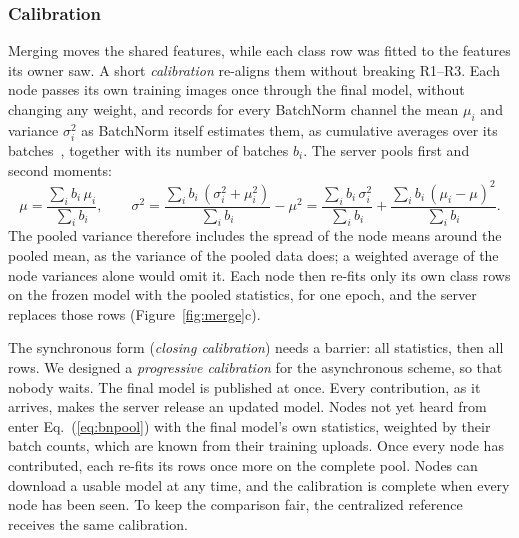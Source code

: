 \documentclass[pdflatex,sn-mathphys-num]{sn-jnl}
\begin{document}
\subsubsection{Calibration}\label{sec:calib}
Merging moves the shared features, while each class row was fitted to the features its owner saw. A short \emph{calibration} re-aligns them without breaking R1--R3. Each node passes its own training images once through the final model, without changing any weight, and records for every BatchNorm channel the mean $\mu_i$ and variance $\sigma_i^2$ as BatchNorm itself estimates them, as cumulative averages over its batches~\cite{ioffe2015bn}, together with its number of batches $b_i$. The server pools first and second moments:
\begin{equation}
\mu=\frac{\sum_i b_i\,\mu_i}{\sum_i b_i},\qquad
\sigma^2=\frac{\sum_i b_i\,(\sigma_i^2+\mu_i^2)}{\sum_i b_i}-\mu^2
=\frac{\sum_i b_i\,\sigma_i^2}{\sum_i b_i}+\frac{\sum_i b_i\,(\mu_i-\mu)^2}{\sum_i b_i}.\label{eq:bnpool}
\end{equation}
The pooled variance therefore includes the spread of the node means around the pooled mean, as the variance of the pooled data does; a weighted average of the node variances alone would omit it. Each node then re-fits only its own class rows on the frozen model with the pooled statistics, for one epoch, and the server replaces those rows (Figure~\ref{fig:merge}c).

The synchronous form (\emph{closing calibration}) needs a barrier: all statistics, then all rows. We designed a \emph{progressive calibration} for the asynchronous scheme, so that nobody waits. The final model is published at once. Every contribution, as it arrives, makes the server release an updated model. Nodes not yet heard from enter Eq.~(\ref{eq:bnpool}) with the final model's own statistics, weighted by their batch counts, which are known from their training uploads. Once every node has contributed, each re-fits its rows once more on the complete pool. Nodes can download a usable model at any time, and the calibration is complete when every node has been seen. To keep the comparison fair, the centralized reference receives the same calibration.
\end{document}
